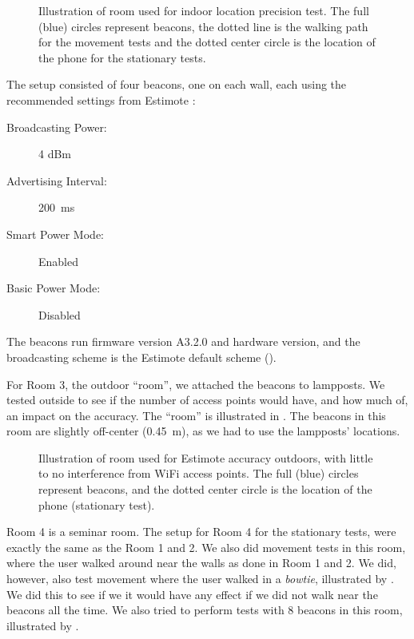 \begin{figure}[!htb]
  \centering
  
  \caption{Illustration of room used for indoor location precision test. The full (blue) circles represent beacons, the dotted line is the walking path for the movement tests and the dotted center circle is the location of the phone for the stationary tests.}
  \label{fig:precisiontest:illustration}
\end{figure}

The setup consisted of four beacons, one on each wall, 
each using the recommended settings from Estimote \cite{estimote:settings}:
\begin{description}
  \item[Broadcasting Power:]{\num{4} dBm}
  \item[Advertising Interval:]{\SI{200}{\milli\second}}
  \item[Smart Power Mode:]{Enabled}
  \item[Basic Power Mode:]{Disabled}
\end{description}
The beacons run firmware version A3.2.0 and hardware version,
and the broadcasting scheme is the Estimote default scheme (\ie). 

For Room 3, the outdoor ``room'',
we attached the beacons to lampposts. 
We tested outside to see if the number of access points would have, and how much of, 
an impact on the accuracy. 
The ``room'' is illustrated in . 
The beacons in this room are slightly off-center (\SI{0.45}{\meter}), 
as we had to use the lampposts' locations. 

\begin{figure}[!htb]
  \centering
  
  \caption{Illustration of room used for Estimote accuracy outdoors, with little to no interference from WiFi access points. The full (blue) circles represent beacons, and the dotted center circle is the location of the phone (stationary test).}
  \label{fig:outdoortest}
\end{figure}

Room 4 is a seminar room. 
The setup for Room 4 for the stationary tests,
were exactly the same as the Room 1 and 2. 
We also did movement tests in this room, 
where the user walked around near the walls as done in Room 1 and 2. 
We did, however, also test movement where the user walked in a \emph{bowtie},
illustrated by . 
We did this to see if we it would have any effect if we did not walk near the beacons all the time. 
We also tried to perform tests with \num{8} beacons in this room, 
illustrated by . 

